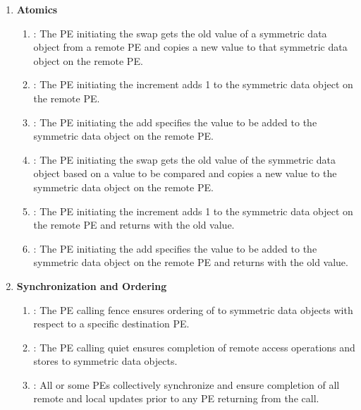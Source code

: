 \begin{enumerate}
\item \textbf{Atomics}
\begin{enumerate}
    \item {}: The \ac{PE} initiating the swap gets the old value of a
        symmetric data object from a remote \ac{PE} and copies a new value to
        that symmetric data object on the remote \ac{PE}.
  \item {}: The \ac{PE} initiating the increment adds 1 to the
      symmetric data object on the remote \ac{PE}.
  \item {}: The \ac{PE} initiating the add specifies the value to be added
      to the symmetric data object on the remote \ac{PE}.
  \item {}: The \ac{PE} initiating the swap gets the old value
      of the symmetric data object based on a value to be compared and copies a
      new value to the symmetric data object on the remote \ac{PE}.
  \item {}: The \ac{PE} initiating the increment adds 1 to
      the symmetric data object on the remote \ac{PE} and returns with the old
      value.
  \item {}: The \ac{PE} initiating the add specifies the value to
      be added to the symmetric data object on the remote \ac{PE} and returns with
      the old value.
\end{enumerate}

\item \textbf{Synchronization and Ordering}
\begin{enumerate}
  \item {}: The \ac{PE} calling fence ensures ordering of   
  to symmetric data objects with respect to a specific
      destination \ac{PE}. 
  \item {}: The \ac{PE} calling quiet ensures completion of remote access
      operations and stores to symmetric data objects. 
  \item {}: All or some \ac{PE}s collectively synchronize and ensure
      completion of all remote and local updates prior to any \ac{PE} returning
      from the call.
\end{enumerate}


\end{enumerate}
